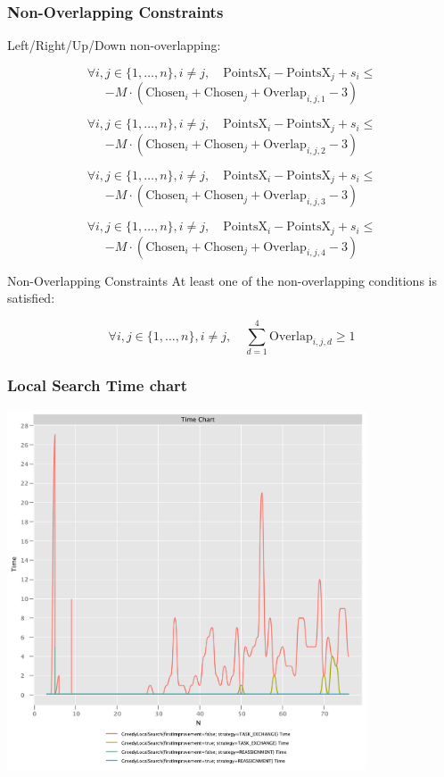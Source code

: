 \documentclass{beamer}
\begin{document}
\begin{frame}
\frametitle{Non-Overlapping Constraints}
Left/Right/Up/Down non-overlapping:


\[
\forall i, j \in \{1, \ldots, n\}, i \neq j, \quad \text{PointsX}_i - \text{PointsX}_j + s_i \leq
\]
\[
-M \cdot (\text{Chosen}_i + \text{Chosen}_j + \text{Overlap}_{i,j,1} - 3)
\]

\[
\forall i, j \in \{1, \ldots, n\}, i \neq j, \quad \text{PointsX}_i - \text{PointsX}_j + s_i \leq
\]
\[
-M \cdot (\text{Chosen}_i + \text{Chosen}_j + \text{Overlap}_{i,j,2} - 3)
\]

\[
\forall i, j \in \{1, \ldots, n\}, i \neq j, \quad \text{PointsX}_i - \text{PointsX}_j + s_i \leq
\]
\[
-M \cdot (\text{Chosen}_i + \text{Chosen}_j + \text{Overlap}_{i,j,3} - 3)
\]

\[
\forall i, j \in \{1, \ldots, n\}, i \neq j, \quad \text{PointsX}_i - \text{PointsX}_j + s_i \leq
\]
\[
-M \cdot (\text{Chosen}_i + \text{Chosen}_j + \text{Overlap}_{i,j,4} - 3)
\]
\end{frame}

\begin{frame}{Non-Overlapping Constraints}
At least one of the non-overlapping conditions is satisfied:

\[
\forall i, j \in \{1, \ldots, n\}, i \neq j, \quad \sum_{d=1}^4 \text{Overlap}_{i,j,d} \geq 1
\]
    
\end{frame}

\begin{frame}
\frametitle{Local Search Time chart}
\includegraphics[width=0.8\textwidth]{./documentation/assets/localSearchParams.timeChart.pdf}
\end{frame}
\end{document}
